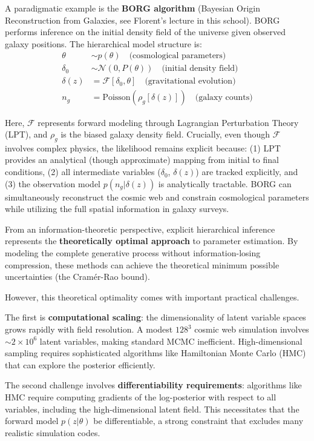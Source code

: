 \documentclass[11pt,a4paper]{article}
\theoremstyle{definition}
\begin{document}
A paradigmatic example is the \textbf{BORG algorithm} (Bayesian Origin Reconstruction from Galaxies, see Florent's lecture in this school). BORG performs inference on the initial density field of the universe given observed galaxy positions. The hierarchical model structure is:
\begin{align}
    \theta &\sim p(\theta) \quad \text{(cosmological parameters)} \\
    \delta_0 &\sim \mathcal{N}(0, P(\theta)) \quad \text{(initial density field)} \\
    \delta(z) &= \mathcal{F}[\delta_0, \theta] \quad \text{(gravitational evolution)} \\
    n_g &= \text{Poisson}(\rho_g[\delta(z)]) \quad \text{(galaxy counts)}
\end{align}

Here, $\mathcal{F}$ represents forward modeling through Lagrangian Perturbation Theory (LPT), and $\rho_g$ is the biased galaxy density field. Crucially, even though $\mathcal{F}$ involves complex physics, the likelihood remains explicit because: (1) LPT provides an analytical (though approximate) mapping from initial to final conditions, (2) all intermediate variables ($\delta_0$, $\delta(z)$) are tracked explicitly, and (3) the observation model $p(n_g|\delta(z))$ is analytically tractable. BORG can simultaneously reconstruct the cosmic web and constrain cosmological parameters while utilizing the full spatial information in galaxy surveys.

From an information-theoretic perspective, explicit hierarchical inference represents the \textbf{theoretically optimal approach} to parameter estimation. By modeling the complete generative process without information-losing compression, these methods can achieve the theoretical minimum possible uncertainties (the Cramér-Rao bound). 

However, this theoretical optimality comes with important practical challenges. 

The first is \textbf{computational scaling}: the dimensionality of latent variable spaces grows rapidly with field resolution. A modest $128^3$ cosmic web simulation involves $\sim 2 \times 10^6$ latent variables, making standard MCMC inefficient. High-dimensional sampling requires sophisticated algorithms like Hamiltonian Monte Carlo (HMC) that can explore the posterior efficiently.

The second challenge involves \textbf{differentiability requirements}: algorithms like HMC require computing gradients of the log-posterior with respect to all variables, including the high-dimensional latent field. This necessitates that the forward model $p(z|\theta)$ be differentiable, a strong constraint that excludes many realistic simulation codes.
\end{document}
